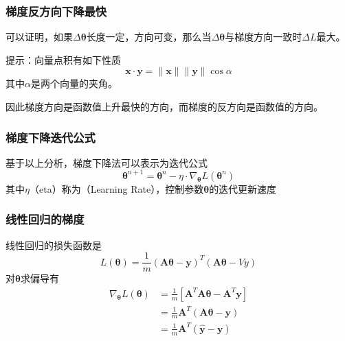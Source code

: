 \documentclass[14pt]{beamer}
\newcommand{\mat}[1]{\bm{#1}}
\renewcommand{\vec}[1]{\bm{#1}}
\newcommand{\MA}{\mat{A}}
\newcommand{\Vy}{\vec{y}}
\newcommand{\Vx}{\vec{x}}
\newcommand{\Vt}{\vec{\theta}}
\let\emph\relax %
\begin{document}
\begin{frame}
  \frametitle{梯度反方向下降最快}
  可以证明，如果$\Delta\Vt$长度一定，方向可变，那么当$\Delta\Vt$与梯度方向一致时$\Delta L$最大。
  
  提示：向量点积有如下性质
  $$\Vx\cdot\Vy=\|\Vx\|\|\Vy\|\cos\alpha$$
  其中$\alpha$是两个向量的夹角。

  因此梯度方向是函数值上升最快的方向，而梯度的反方向是函数值\emph{下降最快}的方向。
\end{frame}

\begin{frame}
  \frametitle{梯度下降迭代公式}
  基于以上分析，梯度下降法可以表示为迭代公式
  \begin{equation}
    \Vt^{n+1}=\Vt^n-\eta\cdot\nabla_{\Vt} L(\Vt^n)
  \end{equation}
  其中$\eta$（eta）称为\emph{学习速率}（Learning Rate），控制参数$\Vt$的迭代更新速度
\end{frame}

\begin{frame}
  \frametitle{线性回归的梯度}
      线性回归的损失函数是
      \begin{equation*}
        L(\Vt)=\frac{1}{m}(\MA\Vt-\Vy)^T(\MA\Vt-Vy)
      \end{equation*}
      对$\Vt$求偏导有
      \begin{equation}\label{eq:gradient_ls}
        \begin{split}
        \nabla_{\Vt}L(\Vt)&=\frac{1}{m}[\MA^T\MA\Vt-\MA^T\Vy]\\
        &=\frac{1}{m}\MA^T(\MA\Vt-\Vy)\\
        &=\boxed{\frac{1}{m}\MA^T(\hat{\Vy}-\Vy)}
        \end{split}
      \end{equation}
\end{frame}
\end{document}
